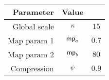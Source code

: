 \begin{tabular}{rcc}
\hline
\textbf{Parameter} & \textbf{Value}  \\ \hline
Global scale & $ {\kappa}$ & $15$ \\ 
Map param 1 & $ {\mathsf{mp}_a}$ & $0.7$ \\ 
Map param 2 & $ {\mathsf{mp}_b}$ & $80$ \\
Compression & $ {\psi}$ & $0.9$ \\ \hline
\end{tabular}
